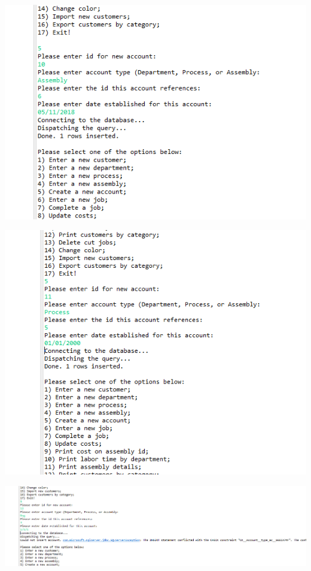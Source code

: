 \documentclass[11pt]{article}
\begin{document}
\includegraphics[width = \textwidth]{acct1.png}

\includegraphics[width = \textwidth]{acct2.png}

\includegraphics[width = \textwidth]{acct3.png}
\end{document}
